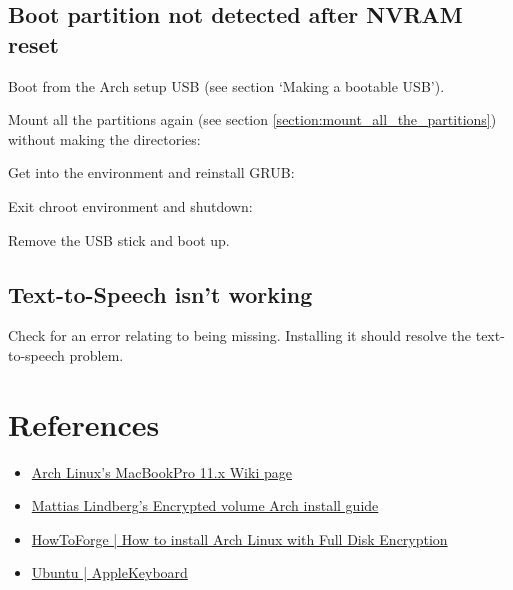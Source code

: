 \subsection{Boot partition not detected after NVRAM reset}

Boot from the Arch setup USB (see section `Making a bootable USB').

Mount all the partitions again (see section \ref{section:mount_all_the_partitions}) without making the directories:


Get into the  environment and reinstall GRUB:


Exit chroot environment and shutdown:


Remove the USB stick and boot up.

\subsection{Text-to-Speech isn't working}

Check  for an error relating to  being missing. Installing it should resolve the text-to-speech problem.


\clearpage
\section{References}

\begin{itemize}
	\item \href{https://wiki.archlinux.org/index.php/MacBookPro11,x#Using_the_MacBook.27s_native_EFI_bootloader_.28recommended.29}{Arch Linux's MacBookPro 11.x Wiki page}
	\item \href{https://gist.github.com/mattiaslundberg/8620837}{Mattias Lindberg's Encrypted volume Arch install guide}
	\item \href{https://www.howtoforge.com/tutorial/how-to-install-arch-linux-with-full-disk-encryption/}{HowToForge | How to install Arch Linux with Full Disk Encryption}
	\item \href{https://help.ubuntu.com/community/AppleKeyboard#Change_Function_Key_behavior}{Ubuntu | AppleKeyboard}
\end{itemize}


